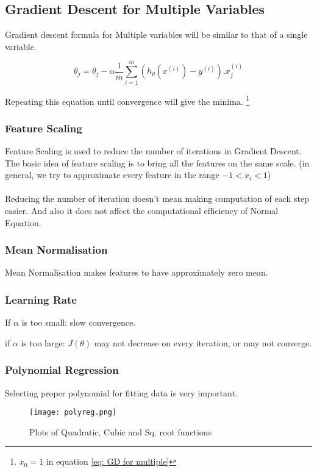   \subsection{Gradient Descent for Multiple Variables}
    Gradient descent formula for Multiple variables will be similar to that of a single variable.

    \begin{equation} \label {eq: GD for multiple}
      \theta_j =  \theta_j - \alpha \frac{1}{m} \sum_{i=1}^{m} (h_\theta(x^{(i)})-y^{(i)}).x_j^{(i)}
    \end{equation}

    Repeating this equation until convergence will give the minima. \footnote[1]{$x_0 = 1$ in equation \ref{eq: GD for multiple}}

  \subsubsection{Feature Scaling}
    Feature Scaling is used to reduce the number of iterations in Gradient Descent. The basic idea of feature scaling is to bring all the features on the same scale. (in general, we try to approximate every feature in the range $ -1 < x_i < 1 $)
    \\ \\ Reducing the number of iteration doesn't mean making computation of each step easier. And also it does not affect the computational efficiency of Normal Equation.

  \subsubsection{Mean Normalisation}
    Mean Normalisation makes features to have approximately zero mean.

  \subsubsection{Learning Rate}
    If $\alpha$ is too small: slow convergence.

    if $\alpha$ is too large: $J(\theta)$ may not decrease on every iteration, or may not converge.

  \subsubsection{Polynomial Regression}
    Selecting proper polynomial for fitting data is very important.

    \begin{figure}[h]
      \centering
      \texttt{[image: polyreg.png]}
      \caption{Plots of Quadratic, Cubic and Sq. root functions}
    \end{figure}

